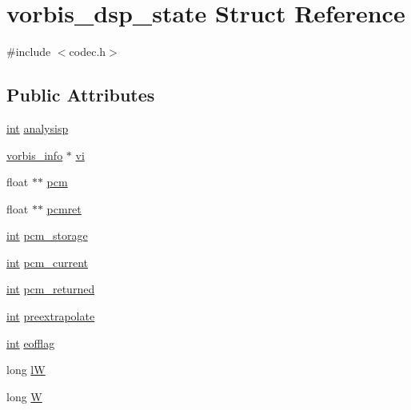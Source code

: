 \hypertarget{structvorbis__dsp__state}{}\section{vorbis\+\_\+dsp\+\_\+state Struct Reference}
\label{structvorbis__dsp__state}


{\ttfamily \#include $<$codec.\+h$>$}

\subsection*{Public Attributes}
\begin{DoxyCompactItemize}
\item 
\hyperlink{xmltok_8h_a5a0d4a5641ce434f1d23533f2b2e6653}{int} \hyperlink{structvorbis__dsp__state_a9b983a6901a311f2d354f2b6c51cf93b}{analysisp}
\item 
\hyperlink{structvorbis__info}{vorbis\+\_\+info} $\ast$ \hyperlink{structvorbis__dsp__state_ab6819a31e79031cdcd8f2ff40a5c1def}{vi}
\item 
float $\ast$$\ast$ \hyperlink{structvorbis__dsp__state_ab33bafd2638e5bea5737709feea89027}{pcm}
\item 
float $\ast$$\ast$ \hyperlink{structvorbis__dsp__state_ab2c2a87593f0d7a3c867ba80102c4260}{pcmret}
\item 
\hyperlink{xmltok_8h_a5a0d4a5641ce434f1d23533f2b2e6653}{int} \hyperlink{structvorbis__dsp__state_a33cf1637859094c31429dace6dfc79e2}{pcm\+\_\+storage}
\item 
\hyperlink{xmltok_8h_a5a0d4a5641ce434f1d23533f2b2e6653}{int} \hyperlink{structvorbis__dsp__state_a6d09bbf3927e337d721b05f669bd70c6}{pcm\+\_\+current}
\item 
\hyperlink{xmltok_8h_a5a0d4a5641ce434f1d23533f2b2e6653}{int} \hyperlink{structvorbis__dsp__state_a8db33e5f4c0b7f31f218c9ff6ccd7ac3}{pcm\+\_\+returned}
\item 
\hyperlink{xmltok_8h_a5a0d4a5641ce434f1d23533f2b2e6653}{int} \hyperlink{structvorbis__dsp__state_aecc3c42d23d876c8bfd396b5c2ac5eb6}{preextrapolate}
\item 
\hyperlink{xmltok_8h_a5a0d4a5641ce434f1d23533f2b2e6653}{int} \hyperlink{structvorbis__dsp__state_af48b32e7555d54a5d18a24385f1296d0}{eofflag}
\item 
long \hyperlink{structvorbis__dsp__state_a7086b355f6ffe286f388e95df943cac0}{lW}
\item 
long \hyperlink{structvorbis__dsp__state_a1cc3a520dcf831fb967341e5095c7b38}{W}

\end{DoxyCompactItemize}
